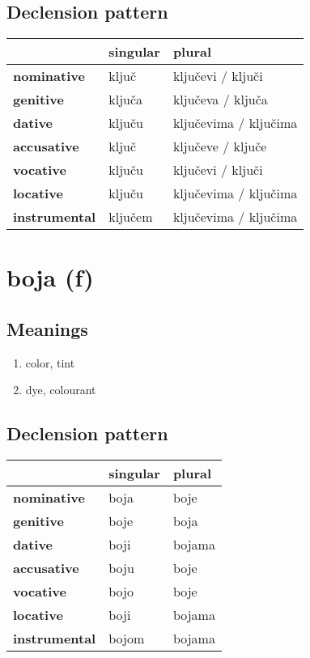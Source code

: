 \subsection*{Declension pattern}
\begin{tabularx}{\linewidth}{Xll}
\toprule
{} & singular &                 plural \\
\midrule
\textbf{nominative  } &    ključ &      ključevi / ključi \\
\textbf{genitive    } &   ključa &      ključeva / ključa \\
\textbf{dative      } &   ključu &  ključevima / ključima \\
\textbf{accusative  } &    ključ &      ključeve / ključe \\
\textbf{vocative    } &   ključu &      ključevi / ključi \\
\textbf{locative    } &   ključu &  ključevima / ključima \\
\textbf{instrumental} &  ključem &  ključevima / ključima \\
\bottomrule
\end{tabularx}

\filbreak
\section{boja (f)}
\subsection*{Meanings}
\begin{enumerate}
\item color, tint
\item dye, colourant
\end{enumerate}
\subsection*{Declension pattern}
\begin{tabularx}{\linewidth}{Xll}
\toprule
{} & singular &  plural \\
\midrule
\textbf{nominative  } &     boja &    boje \\
\textbf{genitive    } &     boje &    boja \\
\textbf{dative      } &     boji &  bojama \\
\textbf{accusative  } &     boju &    boje \\
\textbf{vocative    } &     bojo &    boje \\
\textbf{locative    } &     boji &  bojama \\
\textbf{instrumental} &    bojom &  bojama \\
\bottomrule
\end{tabularx}

